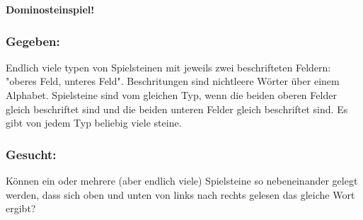 \textbf{Dominosteinspiel!}
\subsubsection*{Gegeben: } Endlich viele typen von Spielsteinen mit jeweils zwei beschrifteten Feldern: "oberes Feld, unteres Feld". Beschritungen sind nichtleere Wörter über einem Alphabet. Spielsteine sind vom gleichen Typ, wenn die beiden oberen Felder gleich beschriftet sind und die beiden unteren Felder gleich beschriftet sind. Es gibt von jedem Typ beliebig viele steine. 

\subsubsection*{Gesucht: }Können ein oder mehrere (aber endlich viele) Spielsteine so nebeneinander gelegt werden, dass sich oben und unten von links nach rechts gelesen das gleiche Wort ergibt?
